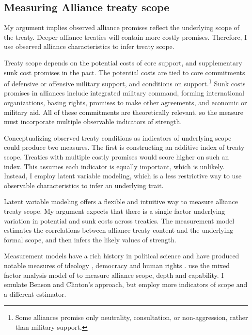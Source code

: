 \documentclass[12pt]{article}
\begin{document}
\subsection{Measuring Alliance treaty scope} 


My argument implies observed alliance promises reflect the underlying scope of the treaty. 
Deeper alliance treaties will contain more costly promises. 
Therefore, I use observed alliance characteristics to infer treaty scope.


Treaty scope depends on the potential costs of core support, and supplementary sunk cost promises in the pact. 
The potential costs are tied to core commitments of defensive or offensive military support, and conditions on support.\footnote{Some alliances promise only neutrality, consultation, or non-aggression, rather than military support.}  
Sunk costs promises in alliances include integrated military command, forming international organizations, basing rights, promises to make other agreements, and economic or military aid. 
All of these commitments are theoretically relevant, so the measure must incorporate multiple observable indicators of strength. 


Conceptualizing observed treaty conditions as indicators of underlying scope could produce two measures. 
The first is constructing an additive index of treaty scope. 
Treaties with multiple costly promises would score higher on such an index. 
This assumes each indicator is equally important, which is unlikely. 
Instead, I employ latent variable modeling, which is a less restrictive way to use observable characteristics to infer an underlying trait. 


Latent variable modeling offers a flexible and intuitive way to measure alliance treaty scope. 
My argument expects that there is a single factor underlying variation in potential and sunk costs across treaties.  
The measurement model estimates the correlations between alliance treaty content and the underlying formal scope, and then infers the likely values of strength. 


Measurement models have a rich history in political science and have produced notable measures of ideology \citep{Clintonetal2004}, democracy \citep{TreierJackman2008} and human rights \citep{Fariss2014}. 
\citet{BensonClinton2016} use the mixed factor analysis model of \citet{Quinn2004} to measure alliance scope, depth and capability.
I emulate Benson and Clinton's approach, but employ more indicators of scope and a different estimator. 
\end{document}
